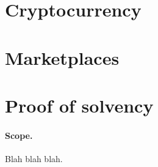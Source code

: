 \section{Cryptocurrency}

\section{Marketplaces}

\section{Proof of solvency}


 

\paragraph{Scope.} 
Blah blah blah.




